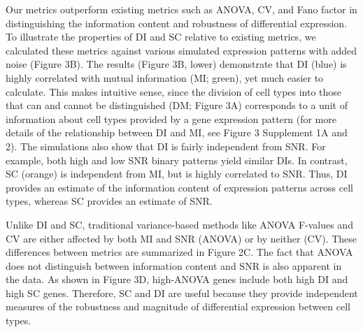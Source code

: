 Our metrics outperform existing metrics such as ANOVA, CV, and Fano factor in distinguishing the information content and robustness of differential expression. To illustrate the properties of DI and SC relative to existing metrics, we calculated these metrics against various simulated expression patterns with added noise (Figure 3B). The results (Figure 3B, lower) demonstrate that DI (blue) is highly correlated with mutual information (MI; green), yet much easier to calculate. This makes intuitive sense, since the division of cell types into those that can and cannot be distinguished (DM; Figure 3A) corresponds to a unit of information about cell types provided by a gene expression pattern (for more details of the relationship between DI and MI, see Figure 3 Supplement 1A and 2). 
The simulations also show that DI is fairly independent from SNR. For example, both high and low SNR binary patterns yield similar DIs. In contrast, SC (orange) is independent from MI, but is highly correlated to SNR. Thus, DI provides an estimate of the information content of expression patterns across cell types, whereas SC provides an estimate of SNR.

Unlike DI and SC, traditional variance-based methods like ANOVA F-values and CV are either affected by both MI and SNR (ANOVA) or by neither (CV). These differences between metrics are summarized in Figure 2C. The fact that ANOVA does not distinguish between information content and SNR is also apparent in the data. As shown in Figure 3D, high-ANOVA genes include both high DI and high SC genes. Therefore, SC and DI are useful because they provide independent measures of the robustness and magnitude of differential expression between cell types.






















